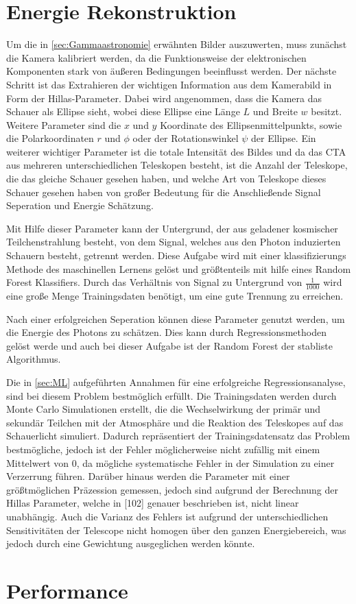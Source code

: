 \section{Energie Rekonstruktion}

Um die in \autoref{sec:Gammaastronomie} erwähnten Bilder auszuwerten, muss zunächst die Kamera kalibriert werden, da die Funktionsweise der elektronischen
Komponenten stark von äußeren Bedingungen beeinflusst werden.
Der nächste Schritt ist das Extrahieren der wichtigen Information aus dem Kamerabild in Form der Hillas-Parameter.
Dabei wird angenommen, dass die Kamera das Schauer als Ellipse sieht, wobei diese Ellipse eine Länge $L$ und Breite $w$ besitzt.
Weitere Parameter sind die $x$ und $y$ Koordinate des Ellipsenmittelpunkts, sowie die Polarkoordinaten $r$ und $\phi$ oder der Rotationswinkel $\psi$
der Ellipse.
Ein weiterer wichtiger Parameter ist die totale Intensität des Bildes und da das CTA aus mehreren unterschiedlichen Teleskopen besteht, ist die Anzahl
der Teleskope, die das gleiche Schauer gesehen haben, und welche Art von Teleskope dieses Schauer gesehen haben von großer Bedeutung für die Anschließende
Signal Seperation und Energie Schätzung.

Mit Hilfe dieser Parameter kann der Untergrund, der aus geladener kosmischer Teilchenstrahlung besteht, von dem Signal, welches aus den Photon induzierten
Schauern besteht, getrennt werden.
Diese Aufgabe wird mit einer klassifizierungs Methode des maschinellen Lernens gelöst und größtenteils mit hilfe eines
Random Forest Klassifiers.
Durch das Verhältnis von Signal zu Untergrund von $\frac{1}{1000}$\cite{Cherenkov_Licht} wird eine große Menge Trainingsdaten
benötigt, um eine gute Trennung zu erreichen.

Nach einer erfolgreichen Seperation können diese Parameter genutzt werden, um die Energie des Photons zu schätzen.
Dies kann durch Regressionsmethoden gelöst werde und auch bei dieser Aufgabe ist der Random Forest der stabliste Algorithmus\cite{Cherenkov_Licht}.

Die in \autoref{sec:ML} aufgeführten Annahmen für eine erfolgreiche Regressionsanalyse, sind bei diesem Problem bestmöglich erfüllt. Die Trainingsdaten
werden durch Monte Carlo Simulationen erstellt, die die Wechselwirkung der primär und sekundär Teilchen mit der Atmosphäre und die Reaktion des Teleskopes
auf das Schauerlicht simuliert.
Dadurch repräsentiert der Trainingsdatensatz das Problem bestmögliche, jedoch ist der Fehler möglicherweise nicht zufällig mit einem Mittelwert von $0$, da
mögliche systematische Fehler in der Simulation zu einer Verzerrung führen.
Darüber hinaus werden die Parameter mit einer größtmöglichen Präzession gemessen, jedoch sind aufgrund der Berechnung der Hillas Parameter, welche in [102]\cite{HESS}
genauer beschrieben ist, nicht linear unabhängig.
Auch die Varianz des Fehlers ist aufgrund der unterschiedlichen Sensitivitäten der Telescope nicht homogen
über den ganzen Energiebereich, was jedoch durch eine Gewichtung ausgeglichen werden könnte.
 


\section{Performance}

